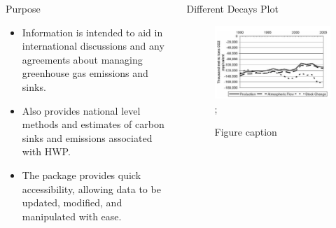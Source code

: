 \documentclass[final]{beamer}\usepackage[]{graphicx}\usepackage[]{color}
\newlength{\onecolwid}
\newlength{\twocolwid}
\begin{document}
\begin{frame}[t]
\begin{columns}[t]
\begin{column}{\twocolwid}
\begin{columns}[t,totalwidth=\twocolwid]
\begin{column}{\onecolwid}
\begin{alertblock}{Purpose}
\begin{itemize}
\item Information is intended to aid in international discussions and any agreements about managing greenhouse gas emissions and sinks.
\item Also provides national level methods and estimates of carbon sinks and emissions associated with HWP.
\item The package provides quick accessibility, allowing data to be updated, modified, and manipulated with ease.
\end{itemize}
\vspace{0ex}

\end{alertblock}




\end{column} %

\begin{column}{\onecolwid}\vspace{-.6in} %

\begin{block}{Different Decays Plot}
\begin{center}

\begin{figure}
    {\includegraphics[width=1\linewidth]{graph1.png}};
    \caption{Figure caption}
\end{figure}
\end{center}
\end{block}


\end{column}
\end{columns}
\end{column}
\end{columns}
\end{frame}
\end{document}
